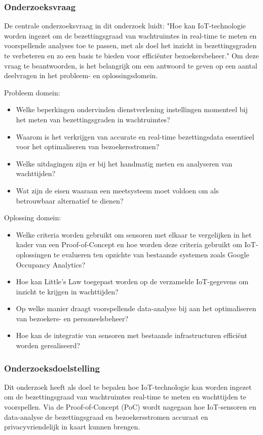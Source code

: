 \subsubsection*{Onderzoeksvraag}
De centrale onderzoeksvraag in dit onderzoek luidt: "Hoe kan IoT-technologie worden ingezet om de bezettingsgraad van wachtruimtes in real-time te meten en voorspellende analyses toe te passen, met als doel het inzicht in bezettingsgraden te verbeteren en zo een basis te bieden voor efficiënter bezoekersbeheer." Om deze vraag te beantwoorden, is het belangrijk om een antwoord te geven op een aantal deelvragen in het probleem- en oplossingsdomein. 

Probleem domein:
\begin{itemize}
    \item Welke beperkingen ondervinden dienstverlening instellingen momenteel bij het meten van bezettingsgraden in wachtruimtes?
    \item Waarom is het verkrijgen van accurate en real-time bezettingsdata essentieel voor het optimaliseren van bezoekersstromen?
    \item Welke uitdagingen zijn er bij het handmatig meten en analyseren van wachttijden?
    \item Wat zijn de eisen waaraan een meetsysteem moet voldoen om als betrouwbaar alternatief te dienen?
\end{itemize}

Oplossing domein:
\begin{itemize}
    \item Welke criteria worden gebruikt om sensoren met elkaar te vergelijken in het kader van een Proof-of-Concept en hoe worden deze criteria gebruikt om IoT-oplossingen te evalueren ten opzichte van bestaande systemen zoals Google Occupancy Analytics?
    \item Hoe kan Little’s Law toegepast worden op de verzamelde IoT-gegevens om inzicht te krijgen in wachttijden?
    \item Op welke manier draagt voorspellende data-analyse bij aan het optimaliseren van bezoekers- en personeelsbeheer?
    \item Hoe kan de integratie van sensoren met bestaande infrastructuren efficiënt worden gerealiseerd?
\end{itemize}

\subsubsection*{Onderzoeksdoelstelling}
Dit onderzoek heeft als doel te bepalen hoe IoT-technologie kan worden ingezet om de bezettingsgraad van wachtruimtes real-time te meten en wachttijden te voorspellen. Via de Proof-of-Concept (PoC) wordt nagegaan hoe IoT-sensoren en data-analyse de bezettingsgraad en bezoekersstromen accuraat en privacyvriendelijk in kaart kunnen brengen.

